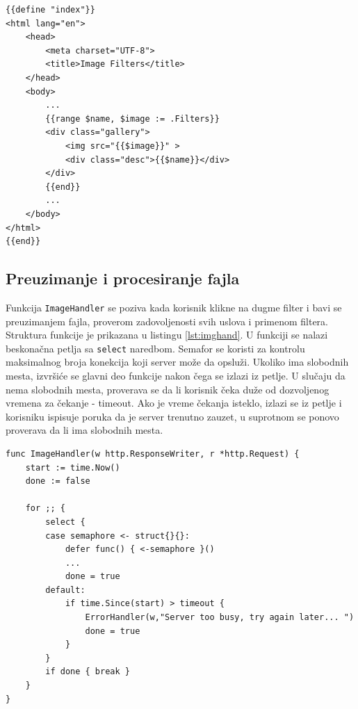 \documentclass[12pt,oneside]{memoir}
\begin{document}
\begin{center}
\begin{lstlisting}[caption=Izvršavanje HTML šablona,label={lst:tmpl2},  backgroundcolor=\color{background}]
{{define "index"}}
<html lang="en">
	<head>
		<meta charset="UTF-8">
		<title>Image Filters</title>
	</head>
	<body>
		...
		{{range $name, $image := .Filters}}
		<div class="gallery">
			<img src="{{$image}}" >
			<div class="desc">{{$name}}</div>
		</div>
		{{end}}
		...
	</body>
</html>
{{end}}
\end{lstlisting}
\end{center}

\subsection{Preuzimanje i procesiranje fajla}

Funkcija \texttt{ImageHandler} se poziva kada korisnik klikne na dugme filter i bavi se preuzimanjem fajla, proverom zadovoljenosti svih uslova i primenom filtera. Struktura funkcije je prikazana u listingu \ref{lst:imghand}. U funkciji se nalazi beskonačna petlja sa \texttt{select} naredbom. Semafor se koristi za kontrolu maksimalnog broja konekcija koji server može da opsluži. Ukoliko ima slobodnih mesta, izvršiće se glavni deo funkcije nakon čega se izlazi iz petlje. U slučaju da nema slobodnih mesta, proverava se da li korisnik čeka duže od dozvoljenog vremena za čekanje - timeout.  Ako je vreme čekanja isteklo, izlazi se iz petlje i korisniku ispisuje poruka da je server trenutno zauzet, u suprotnom se ponovo proverava da li ima slobodnih mesta. 
 
\begin{center}
\begin{lstlisting}[caption=Struktura ImageHandler funkcije,label={lst:imghand},float,  backgroundcolor=\color{background}]
func ImageHandler(w http.ResponseWriter, r *http.Request) {
	start := time.Now()
	done := false

	for ;; {
		select {
		case semaphore <- struct{}{}:
			defer func() { <-semaphore }()
			...
			done = true
		default:
			if time.Since(start) > timeout {
				ErrorHandler(w,"Server too busy, try again later... ")
				done = true
			}
		}
		if done { break }
	}
}

\end{lstlisting}
\end{center}
\end{document}
